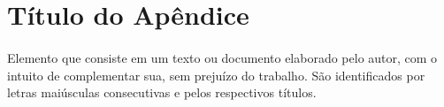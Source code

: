 \section{Título do Apêndice} \label{ap:defesa}

\paragraph{}Elemento que consiste em um texto ou documento elaborado pelo autor, com o intuito de complementar sua, sem prejuízo do trabalho. São identificados por letras maiúsculas consecutivas e pelos respectivos títulos.